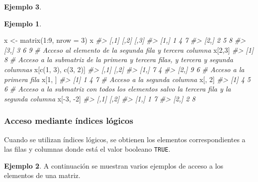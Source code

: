 \documentclass[
]{book}
\newenvironment{Shaded}{\begin{snugshade}}{\end{snugshade}}
\newcommand{\AttributeTok}[1]{\textcolor[rgb]{0.77,0.63,0.00}{#1}}
\newcommand{\CommentTok}[1]{\textcolor[rgb]{0.56,0.35,0.01}{\textit{#1}}}
\newcommand{\DecValTok}[1]{\textcolor[rgb]{0.00,0.00,0.81}{#1}}
\newcommand{\FunctionTok}[1]{\textcolor[rgb]{0.00,0.00,0.00}{#1}}
\newcommand{\NormalTok}[1]{#1}
\newcommand{\OtherTok}[1]{\textcolor[rgb]{0.56,0.35,0.01}{#1}}
\newcommand{\SpecialCharTok}[1]{\textcolor[rgb]{0.00,0.00,0.00}{#1}}
\theoremstyle{definition}
\theoremstyle{definition}
\newtheorem{example}{Ejemplo}[chapter]
\theoremstyle{definition}
\theoremstyle{definition}
\theoremstyle{remark}
\begin{document}
\begin{example}
\begin{example}
\begin{Shaded}
\begin{Highlighting}[]
\NormalTok{x }\OtherTok{\textless{}{-}} \FunctionTok{matrix}\NormalTok{(}\DecValTok{1}\SpecialCharTok{:}\DecValTok{9}\NormalTok{, }\AttributeTok{nrow =} \DecValTok{3}\NormalTok{)}
\NormalTok{x}
\CommentTok{\#\textgreater{}      [,1] [,2] [,3]}
\CommentTok{\#\textgreater{} [1,]    1    4    7}
\CommentTok{\#\textgreater{} [2,]    2    5    8}
\CommentTok{\#\textgreater{} [3,]    3    6    9}
\CommentTok{\# Acceso al elemento de la segunda fila y tercera columna}
\NormalTok{x[}\DecValTok{2}\NormalTok{,}\DecValTok{3}\NormalTok{]}
\CommentTok{\#\textgreater{} [1] 8}
\CommentTok{\# Acceso a la submatriz de la primera y tercera filas, y tercera y segunda columnas}
\NormalTok{x[}\FunctionTok{c}\NormalTok{(}\DecValTok{1}\NormalTok{, }\DecValTok{3}\NormalTok{), }\FunctionTok{c}\NormalTok{(}\DecValTok{3}\NormalTok{, }\DecValTok{2}\NormalTok{)]}
\CommentTok{\#\textgreater{}      [,1] [,2]}
\CommentTok{\#\textgreater{} [1,]    7    4}
\CommentTok{\#\textgreater{} [2,]    9    6}
\CommentTok{\# Acceso a la primera fila}
\NormalTok{x[}\DecValTok{1}\NormalTok{, ]}
\CommentTok{\#\textgreater{} [1] 1 4 7}
\CommentTok{\# Acceso a la segunda columna}
\NormalTok{x[, }\DecValTok{2}\NormalTok{]}
\CommentTok{\#\textgreater{} [1] 4 5 6}
\CommentTok{\# Acceso a la submatriz con todos los elementos salvo la tercera fila y la segunda columna}
\NormalTok{x[}\SpecialCharTok{{-}}\DecValTok{3}\NormalTok{, }\SpecialCharTok{{-}}\DecValTok{2}\NormalTok{]}
\CommentTok{\#\textgreater{}      [,1] [,2]}
\CommentTok{\#\textgreater{} [1,]    1    7}
\CommentTok{\#\textgreater{} [2,]    2    8}
\end{Highlighting}
\end{Shaded}

\end{example}

\hypertarget{acceso-mediante-uxedndices-luxf3gicos}{%
\subsubsection{Acceso mediante índices lógicos}\label{acceso-mediante-uxedndices-luxf3gicos}}

Cuando se utilizan índices lógicos, se obtienen los elementos correspondientes a las filas y columnas donde está el valor booleano \texttt{TRUE}.

\begin{example}

A continuación se muestran varios ejemplos de acceso a los elementos de una matriz.


\end{example}
\end{example}
\end{document}
